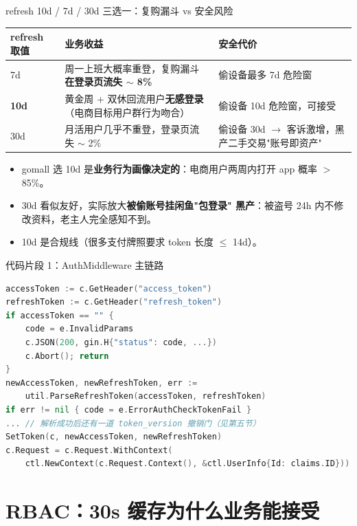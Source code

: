 \documentclass[aspectratio=169,11pt]{beamer}
\begin{document}
\begin{frame}[shrink]{refresh 10d / 7d / 30d 三选一：复购漏斗 vs 安全风险}
\footnotesize
\begin{tabular}{@{}lp{3.6cm}p{3.6cm}@{}}
\toprule
refresh 取值 & 业务收益 & 安全代价 \\
\midrule
7d  & 周一上班大概率重登，复购漏斗\textbf{在登录页流失 \(\sim\) 8\%} & 偷设备最多 7d 危险窗 \\
\textbf{10d} & 黄金周 + 双休回流用户\textbf{无感登录}（电商目标用户群行为吻合） & 偷设备 10d 危险窗，可接受 \\
30d & 月活用户几乎不重登，登录页流失 $\sim$ 2\% & 偷设备 30d \(\to\) 客诉激增，黑产二手交易"账号即资产" \\
\bottomrule
\end{tabular}
\vspace{2mm}
\begin{itemize}\footnotesize
  \item gomall 选 10d 是\textbf{业务行为画像决定的}：电商用户两周内打开 app 概率 $>$ 85\%。
  \item 30d 看似友好，实际放大\textbf{被偷账号挂闲鱼"包登录" 黑产}：被盗号 24h 内不修改资料，老主人完全感知不到。
  \item 10d 是合规线（很多支付牌照要求 token 长度 $\leq$ 14d）。
\end{itemize}
\end{frame}

\begin{frame}{代码片段 1：AuthMiddleware 主链路}
\begin{lstlisting}[language=Go,firstnumber=16,
  caption={}]
accessToken := c.GetHeader("access_token")
refreshToken := c.GetHeader("refresh_token")
if accessToken == "" {
    code = e.InvalidParams
    c.JSON(200, gin.H{"status": code, ...})
    c.Abort(); return
}
newAccessToken, newRefreshToken, err :=
    util.ParseRefreshToken(accessToken, refreshToken)
if err != nil { code = e.ErrorAuthCheckTokenFail }
... // 解析成功后还有一道 token_version 撤销门（见第五节）
SetToken(c, newAccessToken, newRefreshToken)
c.Request = c.Request.WithContext(
    ctl.NewContext(c.Request.Context(), &ctl.UserInfo{Id: claims.ID}))
\end{lstlisting}
\end{frame}

\section{RBAC：30s 缓存为什么业务能接受}
\end{document}
